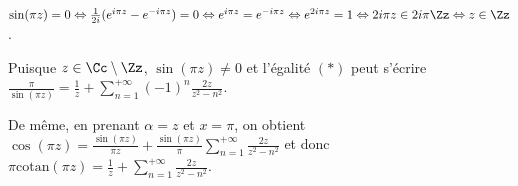 {\begin{enumerate}
{\begin{center}
$\sin(\pi z)=0\Leftrightarrow\frac{1}{2i}(e^{i\pi z}-e^{-i\pi z})=0\Leftrightarrow e^{i\pi z}=e^{-i\pi z}\Leftrightarrow e^{2i\pi z}=1\Leftrightarrow 2i\pi z\in2i\pi\Zz\Leftrightarrow z\in\Zz$.
\end{center}

Puisque $z\in\Cc\setminus\Zz$, $\sin(\pi z)\neq 0$ et l'égalité $(*)$ peut s'écrire $\frac{\pi}{\sin(\pi z)}=\frac{1}{z}+\sum_{n=1}^{+\infty}(-1)^n\frac{2z}{z^2-n^2}$.

De même, en prenant $\alpha=z$ et $x=\pi$, on obtient $\cos(\pi z)=\frac{\sin(\pi z)}{\pi z}+\frac{\sin(\pi z)}{\pi}\sum_{n=1}^{+\infty}\frac{2z}{z^2-n^2}$ et donc $\pi\mathrm{cotan}(\pi z)=\frac{1}{z}+\sum_{n=1}^{+\infty}\frac{2z}{z^2-n^2}$.

\begin{center}
\end{center}}
\end{enumerate}
}
